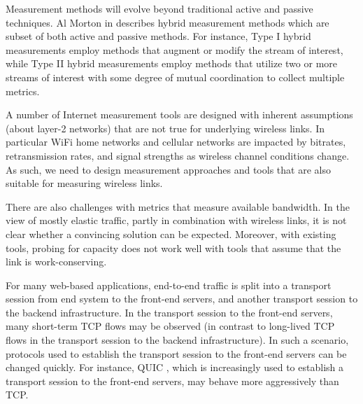 
Measurement methods will evolve beyond traditional active and passive
techniques. Al Morton in \cite{draft-ietf-ippm-active-passive} describes
hybrid measurement methods which are subset of both active and passive
methods. For instance, Type I hybrid measurements employ methods that augment
or modify the stream of interest, while Type II hybrid measurements employ
methods that utilize two or more streams of interest with some degree of
mutual coordination to collect multiple metrics.


A number of Internet measurement tools are designed with inherent assumptions
(about layer-2 networks) \cite{ssundaresan:pam:2015} that are not true for
underlying wireless links.  In particular WiFi home networks and cellular
networks are impacted by bitrates, retransmission rates, and signal strengths
as wireless channel conditions change. As such, we need to design measurement
approaches and tools that are also suitable for measuring wireless links.


There are also challenges with metrics that measure available bandwidth.  In
the view of mostly elastic traffic, partly in combination with wireless links,
it is not clear whether a convincing solution can be expected. Moreover, with
existing tools, probing for capacity does not work well with tools that assume
that the link is work-conserving.


For many web-based applications, end-to-end traffic is split
\cite{apathak:pam:2010} into a transport session from end system to the
front-end servers, and another transport session to the backend
infrastructure.  In the transport session to the front-end servers, many
short-term TCP flows may be observed (in contrast to long-lived TCP flows in
the transport session to the backend infrastructure). In such a scenario,
protocols used to establish the transport session to the front-end servers can
be changed quickly. For instance, \ac{QUIC} \cite{draft-tsvwg-quic-protocol},
which is increasingly used to establish a transport session to the front-end
servers, may behave more aggressively than TCP.


